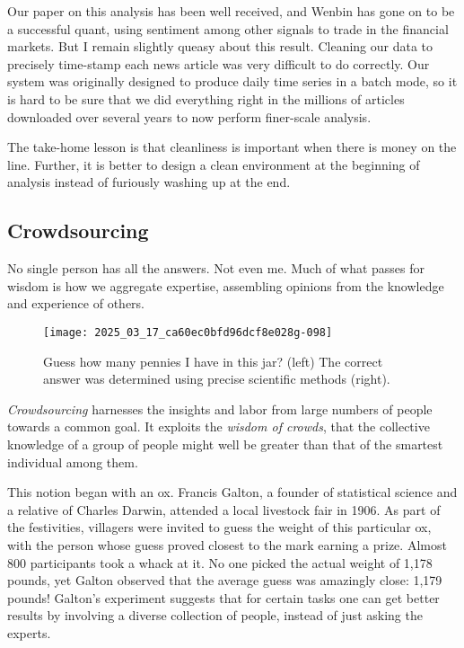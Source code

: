 \documentclass[10pt]{article}
\begin{document}
Our paper on this analysis \cite{zhang2010trading} has been well received, and Wenbin has gone on to be a successful quant, using sentiment among other signals to trade in the financial markets. But I remain slightly queasy about this result. Cleaning our data to precisely time-stamp each news article was very difficult to do correctly. Our system was originally designed to produce daily time series in a batch mode, so it is hard to be sure that we did everything right in the millions of articles downloaded over several years to now perform finer-scale analysis.

The take-home lesson is that cleanliness is important when there is money on the line. Further, it is better to design a clean environment at the beginning of analysis instead of furiously washing up at the end.

\subsection{Crowdsourcing}

No single person has all the answers. Not even me. Much of what passes for wisdom is how we aggregate expertise, assembling opinions from the knowledge and experience of others.

\begin{figure}[h]
  \centering
  \texttt{[image: 2025\_03\_17\_ca60ec0bfd96dcf8e028g-098]}
  \caption{Guess how many pennies I have in this jar? (left) The correct answer was determined using precise scientific methods (right).}
  \label{fig:penny_jar}
\end{figure}

\textit{Crowdsourcing} harnesses the insights and labor from large numbers of people towards a common goal. It exploits the \textit{wisdom of crowds}, that the collective knowledge of a group of people might well be greater than that of the smartest individual among them.

This notion began with an ox. Francis Galton, a founder of statistical science and a relative of Charles Darwin, attended a local livestock fair in 1906. As part of the festivities, villagers were invited to guess the weight of this particular ox, with the person whose guess proved closest to the mark earning a prize. Almost 800 participants took a whack at it. No one picked the actual weight of 1,178 pounds, yet Galton observed that the average guess was amazingly close: 1,179 pounds! Galton's experiment suggests that for certain tasks one can get better results by involving a diverse collection of people, instead of just asking the experts.
\end{document}
